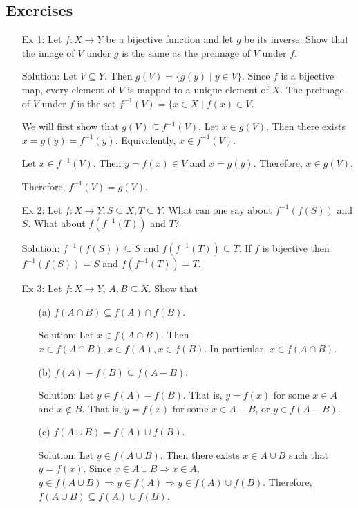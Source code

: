 \subsection{Exercises}
\begin{enumerate}
\item[Ex 1:] Let $f: X \rightarrow Y$ be a bijective function and let 
$g$ be its inverse. Show that the image of $V$ under $g$ is the same as 
the preimage of $V$ under $f$.
\item[Solution:] Let $V \subseteq Y$. Then $g(V) = \{g(y) \;|\; y \in V\}$.
Since $f$ is a bijective map, every element of $V$ is mapped to a unique
element of $X$. The preimage of $V$ under $f$ is the set $f^{-1}(V) = \{x
\in X \;|\; f(x) \in V$.

We will first show that $g(V) \subseteq f^{-1}(V)$. Let $x \in g(V)$. Then
there exists $x = g(y) = f^{-1}(y)$. Equivalently, $x \in f^{-1}(V)$.

Let $x \in f^{-1}(V)$. Then $y = f(x) \in V$ and $x = g(y)$. Therefore,
$x \in g(V)$.

Therefore, $f^{-1}(V) = g(V)$.

\item[Ex 2:] Let $f: X \rightarrow Y, S \subseteq X, T \subseteq Y$. What
can one say about $f^{-1}(f(S))$ and $S$. What about $f(f^{-1}(T))$ and 
$T$?
\item[Solution:] $f^{-1}(f(S)) \subseteq S$ and $f(f^{-1}(T)) \subseteq T$.
If $f$ is bijective then $f^{-1}(f(S)) = S$ and $f(f^{-1}(T)) = T$.

\item[Ex 3:] Let $f: X \rightarrow Y$, $A, B \subseteq X$. Show that
\begin{enumerate}
\item[(a)] $f(A \cap B) \subseteq f(A) \cap f(B)$.
\item[Solution:] Let $x \in f(A \cap B)$. Then $x \in f(A \cap B), x \in
f(A), x \in f(B)$. In particular, $x \in f(A \cap B)$.

\item[(b)] $f(A) - f(B) \subseteq f(A - B)$.
\item[Solution:] Let $y \in f(A) - f(B)$. That is, $y = f(x)$ for some $x
\in A$ and $x \notin B$. That is, $y = f(x)$ for some $x \in A - B$, or
$y \in f(A - B)$.

\item[(c)] $f(A \cup B) = f(A) \cup f(B)$.
\item[Solution:] Let $y \in f(A \cup B)$. Then there exists $x \in A \cup
B$ such that $y = f(x)$. Since $x \in A \cup B \Rightarrow x \in A$, $y \in
f(A \cup B) \Rightarrow y \in f(A) \Rightarrow y \in f(A) \cup f(B)$.
Therefore, $f(A \cup B) \subseteq f(A) \cup f(B)$.


\end{enumerate}
\end{enumerate}
